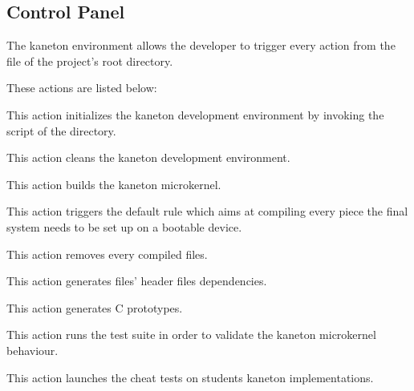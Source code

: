 %
%
%
%
%
%

%
%

\subsection{Control Panel}
\label{section:control panel}

The kaneton environment allows the developer to trigger every action from
the  file of the project's root directory.

These actions are listed below:

        {
	  This action initializes the kaneton development environment by
	  invoking the  script of the 
	  directory.
	}

	{
	  This action cleans the kaneton development environment.
	}

	{
	  This action builds the kaneton microkernel.
	}

	{
	  This action triggers the default rule which aims at compiling every
	  piece the final system needs to be set up on a bootable device.

	  \-


	}

	{
	  This action removes every compiled files.
	}

	{
	  This action generates  files'  header
	  files dependencies.
	}

	{
	  This action generates C prototypes.
	}

	{
	  This action runs the test suite in order to validate the kaneton
	  microkernel behaviour.
	}

	{
	  This action launches the cheat tests on students kaneton
	  implementations.

	  \-


	  \-

	}

